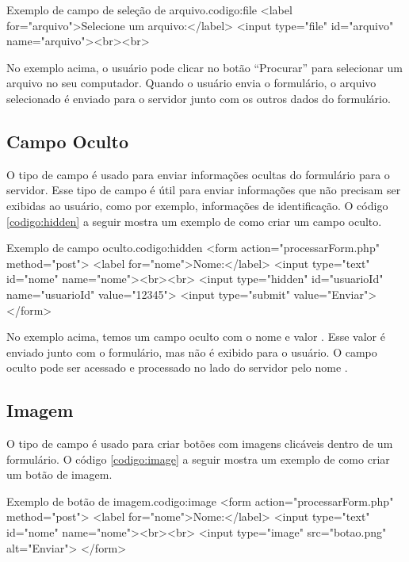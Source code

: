 \begin{htmlcode}{Exemplo de campo de seleção de arquivo.}{codigo:file}
<label for="arquivo">Selecione um arquivo:</label>
<input type="file" id="arquivo" name="arquivo"><br><br>
\end{htmlcode}

No exemplo acima, o usuário pode clicar no botão ``Procurar'' para selecionar um arquivo no seu computador. Quando o usuário envia o formulário, o arquivo selecionado é enviado para o servidor junto com os outros dados do formulário.

\subsection{Campo Oculto}

O tipo de campo  é usado para enviar informações ocultas do formulário para o servidor. Esse tipo de campo é útil para enviar informações que não precisam ser exibidas ao usuário, como por exemplo, informações de identificação. O código \ref{codigo:hidden} a seguir mostra um exemplo de como criar um campo oculto.

\begin{htmlcode}{Exemplo de campo oculto.}{codigo:hidden}
<form action="processarForm.php" method="post">
   <label for="nome">Nome:</label>
   <input type="text" id="nome" name="nome"><br><br>
   <input type="hidden" id="usuarioId" name="usuarioId" value="12345">
   <input type="submit" value="Enviar">
</form>
\end{htmlcode}

No exemplo acima, temos um campo oculto com o nome  e valor . Esse valor é enviado junto com o formulário, mas não é exibido para o usuário. O campo oculto pode ser acessado e processado no lado do servidor pelo nome .

\subsection{Imagem}

O tipo de campo  é usado para criar botões com imagens clicáveis dentro de um formulário. O código \ref{codigo:image} a seguir mostra um exemplo de como criar um botão de imagem.

\begin{htmlcode}{Exemplo de botão de imagem.}{codigo:image}
<form action="processarForm.php" method="post">
   <label for="nome">Nome:</label>
   <input type="text" id="nome" name="nome"><br><br>
   <input type="image" src="botao.png" alt="Enviar">
</form>
\end{htmlcode}

